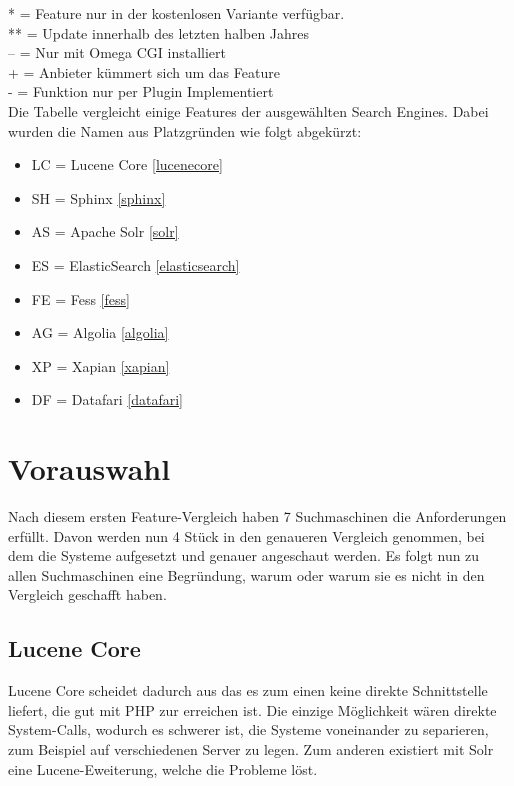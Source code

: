 \begin{table}
    *  = Feature nur in der kostenlosen Variante verfügbar. \\
    ** = Update innerhalb des letzten halben Jahres \\
    -- = Nur mit Omega CGI installiert \\
    +  = Anbieter kümmert sich um das Feature \\
    -  = Funktion nur per Plugin Implementiert \\

    Die Tabelle vergleicht einige Features der ausgewählten Search Engines. Dabei wurden die Namen aus Platzgründen wie folgt abgekürzt:

    \begin{itemize}
        \item LC = Lucene Core \ref{lucenecore}
        \item SH = Sphinx \ref{sphinx}
        \item AS = Apache Solr \ref{solr}
        \item ES = ElasticSearch \ref{elasticsearch}
        \item FE = Fess \ref{fess}
        \item AG = Algolia \ref{algolia}
        \item XP = Xapian \ref{xapian}
        \item DF = Datafari \ref{datafari}
    \end{itemize} 


\end{table}

\section{Vorauswahl}

Nach diesem ersten Feature-Vergleich haben 7 Suchmaschinen die Anforderungen erfüllt. Davon werden nun 4 Stück in den genaueren Vergleich genommen, bei dem die Systeme aufgesetzt und genauer angeschaut werden. Es folgt nun zu allen Suchmaschinen eine Begründung, warum oder warum sie es nicht in den Vergleich geschafft haben.

\subsection{Lucene Core}

Lucene Core scheidet dadurch aus das es zum einen keine direkte Schnittstelle liefert, die gut mit PHP zur erreichen ist. Die einzige Möglichkeit wären direkte System-Calls, wodurch es schwerer ist, die Systeme voneinander zu separieren, zum Beispiel auf verschiedenen Server zu legen. Zum anderen existiert mit Solr eine Lucene-Eweiterung, welche die Probleme löst. \cite{TheApacheSoftwareFoundation.2019b}

